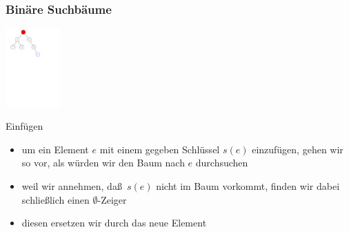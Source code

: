 \documentclass[aspectratio=1610, 11pt]{beamer}
\newcommand{\mytitle}{Bin\"are Suchb\"aume}
\begin{document}
\begin{frame}\frametitle{\mytitle}
	\hfill\includegraphics[height=30mm]{./images/binary_searchtree2.pdf}
	\begin{overprint}
		\begin{exampleblock}{Einf\"ugen}
			\begin{itemize}
				\item um ein Element $e$ mit einem gegeben Schl\"ussel $s(e)$ einzuf\"ugen, gehen wir so vor, als w\"urden wir den Baum nach $e$ durchsuchen
				\item weil wir annehmen, da\ss\ $s(e)$ nicht im Baum vorkommt, finden wir dabei schlie\ss lich einen $\emptyset$-Zeiger
				\item diesen ersetzen wir durch das neue Element
			\end{itemize}
		\end{exampleblock}
	\end{overprint}
\end{frame}
\end{document}
